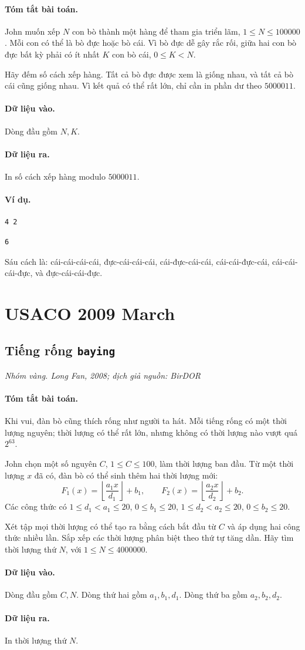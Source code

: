 \documentclass[11pt]{article}
\newcommand{\problem}[4]{%
  \subsection[#1 (#2)]{#1 \hfill {\normalsize\texttt{#2}}}%
  \noindent\textit{#3. #4}\par\smallskip
}
\newcommand{\iosec}[1]{\paragraph{#1}}
\begin{document}
\iosec{Tóm tắt bài toán.}
John muốn xếp \(N\) con bò thành một hàng để tham gia triển lãm,
\(1\le N\le 100000\). Mỗi con có thể là bò đực hoặc bò cái. Vì bò đực dễ gây
rắc rối, giữa hai con bò đực bất kỳ phải có ít nhất \(K\) con bò cái,
\(0\le K<N\).

Hãy đếm số cách xếp hàng. Tất cả bò đực được xem là giống nhau, và tất cả bò
cái cũng giống nhau. Vì kết quả có thể rất lớn, chỉ cần in phần dư theo
\(5000011\).

\iosec{Dữ liệu vào.}
Dòng đầu gồm \(N,K\).

\iosec{Dữ liệu ra.}
In số cách xếp hàng modulo \(5000011\).

\iosec{Ví dụ.}
\begin{verbatim}
4 2
\end{verbatim}

\begin{verbatim}
6
\end{verbatim}

Sáu cách là: cái-cái-cái-cái, đực-cái-cái-cái, cái-đực-cái-cái,
cái-cái-đực-cái, cái-cái-cái-đực, và đực-cái-cái-đực.

\section{USACO 2009 March}

\problem{Tiếng rống}{baying}{Nhóm vàng}{Long Fan, 2008; dịch giả nguồn: BirDOR}

\iosec{Tóm tắt bài toán.}
Khi vui, đàn bò cũng thích rống như người ta hát. Mỗi tiếng rống có một thời
lượng nguyên; thời lượng có thể rất lớn, nhưng không có thời lượng nào vượt
quá \(2^{63}\).

John chọn một số nguyên \(C\), \(1\le C\le 100\), làm thời lượng ban đầu.
Từ một thời lượng \(x\) đã có, đàn bò có thể sinh thêm hai thời lượng mới:
\[
F_1(x)=\left\lfloor\frac{a_1x}{d_1}\right\rfloor+b_1,\qquad
F_2(x)=\left\lfloor\frac{a_2x}{d_2}\right\rfloor+b_2.
\]
Các công thức có \(1\le d_1<a_1\le 20\), \(0\le b_1\le 20\),
\(1\le d_2<a_2\le 20\), \(0\le b_2\le 20\).

Xét tập mọi thời lượng có thể tạo ra bằng cách bắt đầu từ \(C\) và áp dụng
hai công thức nhiều lần. Sắp xếp các thời lượng phân biệt theo thứ tự tăng
dần. Hãy tìm thời lượng thứ \(N\), với \(1\le N\le 4000000\).

\iosec{Dữ liệu vào.}
Dòng đầu gồm \(C,N\). Dòng thứ hai gồm \(a_1,b_1,d_1\). Dòng thứ ba gồm
\(a_2,b_2,d_2\).

\iosec{Dữ liệu ra.}
In thời lượng thứ \(N\).
\end{document}
